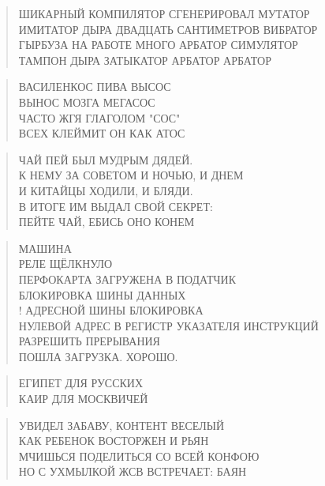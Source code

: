 \poemtitle{***}
\begin{verse}
ШИКАРНЫЙ КОМПИЛЯТОР СГЕНЕРИРОВАЛ МУТАТОР\\
ИМИТАТОР ДЫРА ДВАДЦАТЬ САНТИМЕТРОВ ВИБРАТОР\\
ГЫРБУЗА НА РАБОТЕ МНОГО АРБАТОР СИМУЛЯТОР\\
ТАМПОН ДЫРА ЗАТЫКАТОР АРБАТОР АРБАТОР
\end{verse}

\poemtitle{***}
\begin{verse}
ВАСИЛЕНКОС ПИВА ВЫСОС\\
ВЫНОС МОЗГА МЕГАСОС\\
ЧАСТО ЖГЯ ГЛАГОЛОМ "СОС"\\
ВСЕХ КЛЕЙМИТ ОН КАК АТОС
\end{verse}

\poemtitle{***}
\begin{verse}
ЧАЙ ПЕЙ БЫЛ МУДРЫМ ДЯДЕЙ.\\
К НЕМУ ЗА СОВЕТОМ И НОЧЬЮ, И ДНЕМ\\
И КИТАЙЦЫ ХОДИЛИ, И БЛЯДИ.\\
В ИТОГЕ ИМ ВЫДАЛ СВОЙ СЕКРЕТ:\\
ПЕЙТЕ ЧАЙ, ЕБИСЬ ОНО КОНЕМ
\end{verse}

\poemtitle{***}
\begin{verse}
МАШИНА \\
РЕЛЕ ЩЁЛКНУЛО\\
ПЕРФОКАРТА ЗАГРУЖЕНА В ПОДАТЧИК\\
БЛОКИРОВКА ШИНЫ ДАННЫХ \\!
АДРЕСНОЙ ШИНЫ БЛОКИРОВКА\\
НУЛЕВОЙ АДРЕС В РЕГИСТР УКАЗАТЕЛЯ ИНСТРУКЦИЙ\\
РАЗРЕШИТЬ ПРЕРЫВАНИЯ\\
ПОШЛА ЗАГРУЗКА. ХОРОШО.
\end{verse}

\poemtitle{***}
\begin{verse}
ЕГИПЕТ ДЛЯ РУССКИХ\\
КАИР ДЛЯ МОСКВИЧЕЙ
\end{verse}

\poemtitle{***}
\begin{verse}
УВИДЕЛ ЗАБАВУ, КОНТЕНТ ВЕСЕЛЫЙ\\
КАК РЕБЕНОК ВОСТОРЖЕН И РЬЯН\\
МЧИШЬСЯ ПОДЕЛИТЬСЯ СО ВСЕЙ КОНФОЮ\\
НО С УХМЫЛКОЙ ЖСВ ВСТРЕЧАЕТ: БАЯН
\end{verse}

